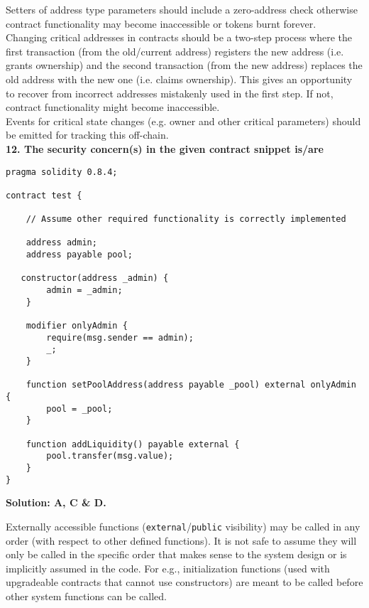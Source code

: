 Setters of address type parameters should include a zero-address check otherwise contract functionality may become inaccessible or tokens burnt forever.\\

Changing critical addresses in contracts should be a two-step process where the first transaction (from the old/current address) registers the new address (i.e. grants ownership) and the second transaction (from the new address) replaces the old address with the new one (i.e. claims ownership).
This gives an opportunity to recover from incorrect addresses mistakenly used in the first step.
If not, contract functionality might become inaccessible.\\

Events for critical state changes (e.g. owner and other critical parameters) should be emitted for tracking this off-chain.\\

\textbf{12. The security concern(s) in the given contract snippet is/are}\label{sec:exam4_q12}\\

\begin{lstlisting}[language=Solidity, style=solStyle]
pragma solidity 0.8.4;

contract test {

    // Assume other required functionality is correctly implemented

    address admin;
    address payable pool;

   constructor(address _admin) {
        admin = _admin;
    }

    modifier onlyAdmin {
        require(msg.sender == admin);
        _;
    }

    function setPoolAddress(address payable _pool) external onlyAdmin {
        pool = _pool;
    }

    function addLiquidity() payable external {
        pool.transfer(msg.value);
    }
}
\end{lstlisting}

\textbf{Solution: A, C \& D.}

Externally accessible functions (\verb|external|/\verb|public| visibility) may be called in any order (with respect to other defined functions).
It is not safe to assume they will only be called in the specific order that makes sense to the system design or is implicitly assumed in the code.
For e.g., initialization functions (used with upgradeable contracts that cannot use constructors) are meant to be called before other system functions can be called.\\

